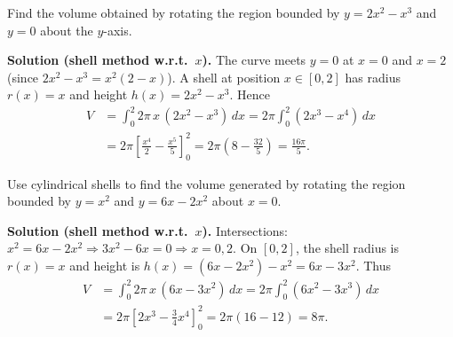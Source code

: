 \begin{examplebox}[title={Worked Example (Lecture Example 2.7): Rotate $y=2x^2-x^3$ about the $y$-axis}]
Find the volume obtained by rotating the region bounded by $y=2x^2-x^3$ and $y=0$ about the $y$-axis.

\textbf{Solution (shell method w.r.t.\ $x$).}
The curve meets $y=0$ at $x=0$ and $x=2$ (since $2x^2-x^3=x^2(2-x)$).
A shell at position $x\in[0,2]$ has radius $r(x)=x$ and height $h(x)=2x^2-x^3$. Hence
\begin{align*}
V
&=\int_{0}^{2}2\pi\,x\,(2x^2-x^3)\,dx
=2\pi\int_{0}^{2}(2x^3-x^4)\,dx\\
&=2\pi\left[\frac{x^4}{2}-\frac{x^5}{5}\right]_{0}^{2}
=2\pi\left(8-\frac{32}{5}\right)
=\frac{16\pi}{5}.
\end{align*}
\end{examplebox}

\begin{examplebox}[title={Worked Example (Tutorial 4, Question 1(a)): Shells about $x=0$}]
Use cylindrical shells to find the volume generated by rotating the region bounded by
$y=x^2$ and $y=6x-2x^2$ about $x=0$.

\textbf{Solution (shell method w.r.t.\ $x$).}
Intersections: $x^2=6x-2x^2\Rightarrow 3x^2-6x=0\Rightarrow x=0,2$.
On $[0,2]$, the shell radius is $r(x)=x$ and height is
$h(x)=(6x-2x^2)-x^2=6x-3x^2$. Thus
\begin{align*}
V
&=\int_{0}^{2}2\pi\,x\,(6x-3x^2)\,dx
=2\pi\int_{0}^{2}(6x^2-3x^3)\,dx\\
&=2\pi\left[2x^3-\frac{3}{4}x^4\right]_{0}^{2}
=2\pi(16-12)=8\pi.
\end{align*}
\end{examplebox}

